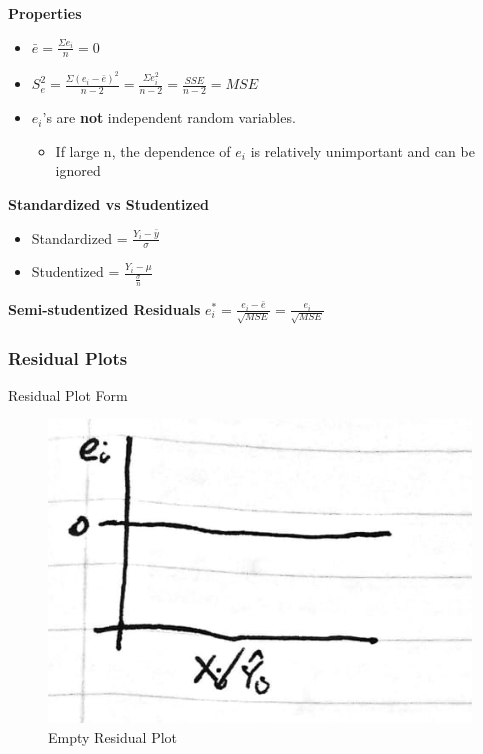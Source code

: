 \documentclass[11pt]{article}
\begin{document}
\textbf{Properties}
\begin{itemize}
\item \(\bar{e} = \frac{\Sigma e_i}{n} = 0\)
\item \(S^2_e = \frac{\Sigma (e_i - \bar{e})^2}{n - 2} = \frac{\Sigma e_i^2}{n - 2} =
  \frac{SSE}{n - 2} = MSE\)
\item \(e_i\)'s are \textbf{not} independent random variables.
\begin{itemize}
\item If large n, the dependence of \(e_i\) is relatively unimportant and can be
ignored
\end{itemize}
\end{itemize}

\textbf{Standardized vs Studentized}
\begin{itemize}
\item Standardized = \(\frac{Y_i - \bar{y}}{\sigma}\)
\item Studentized = \(\frac{Y_i - \mu}{\frac{\sigma}{n}}\)
\end{itemize}

\textbf{Semi-studentized Residuals}
\(e_i^* =\frac{e_i - \bar{e}}{\sqrt{MSE}} =\frac{e_i}{\sqrt{MSE}}\)

\subsubsection{Residual Plots}
\label{sec:orgce5e4c7}

Residual Plot Form

\begin{figure}[htbp]
\centering
\includegraphics[width=.9\linewidth]{./images/empty_res-1.jpg}
\caption{\label{fig:org63ff33a}Empty Residual Plot}
\end{figure}
\end{document}
